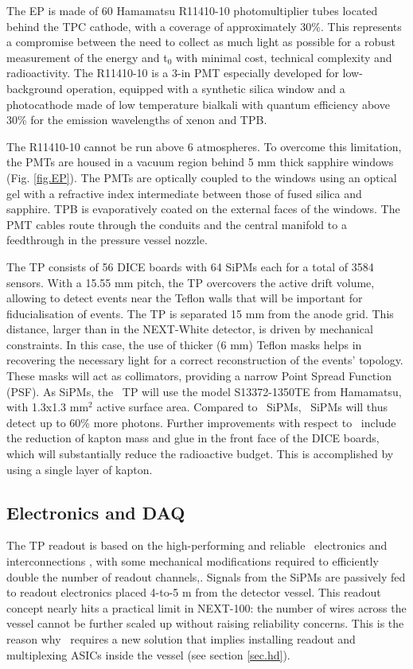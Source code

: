 The EP is made of 60 Hamamatsu R11410-10 photomultiplier tubes located behind the TPC cathode, with a coverage of approximately 30\%. This represents a compromise between the need to collect as much light as possible for a robust measurement of the energy and t$_0$ with minimal cost, technical complexity and radioactivity. The R11410-10 is a 3-in PMT especially developed for low-background operation, equipped with a synthetic silica window and a photocathode made of low temperature bialkali with quantum efficiency above 30\% for the emission wavelengths of xenon and TPB.

The R11410-10 cannot be run above 6 atmospheres. To overcome this limitation, the PMTs are housed in a vacuum region behind 5 mm thick sapphire windows (Fig. \ref{fig.EP}). The PMTs are optically coupled to the windows using an optical gel with a refractive index intermediate between those of fused silica and sapphire. TPB is evaporatively coated on the external faces of the windows. 
The PMT cables route through the conduits and the central manifold to a feedthrough in the pressure vessel nozzle.  


The TP consists of 56 DICE boards with 64 SiPMs each for a total of 3584 sensors. With a 15.55 mm pitch, the TP overcovers the active drift volume, allowing to detect events near the Teflon walls that will be important for fiducialisation of events.
The TP is separated 15 mm from the anode grid. This distance, larger than in the NEXT-White detector, is driven by mechanical constraints. In this case, the use of thicker (6 mm) Teflon masks helps in recovering the necessary light for a correct reconstruction of the events’ topology. These masks will act as collimators, providing a narrow Point Spread Function (PSF). As SiPMs, the \Next\ TP will use the model S13372-1350TE from Hamamatsu, with 1.3x1.3 mm$^2$ active surface area. Compared to \New\ SiPMs, \Next\ SiPMs will thus detect up to 60\% more photons.
Further improvements with respect to \NEW\ include the reduction of kapton mass and glue in the front face of the DICE boards, which will substantially reduce the radioactive budget. This is accomplished by using a single layer of kapton.

\subsection{Electronics and DAQ}

The TP readout is based on the high-performing and reliable \NEW\ electronics and interconnections \cite{Rodriguez:2015a}, with some mechanical modifications required to efficiently double the number of readout channels,. Signals from the SiPMs are passively fed to readout electronics placed 4-to-5 m from the detector vessel. This readout concept nearly hits a practical limit in NEXT-100: the number of wires across the vessel cannot be further scaled up without raising reliability concerns. This is the reason why \NHD\  requires a new solution that implies installing readout and multiplexing ASICs inside the vessel (see section \ref{sec.hd}). %

